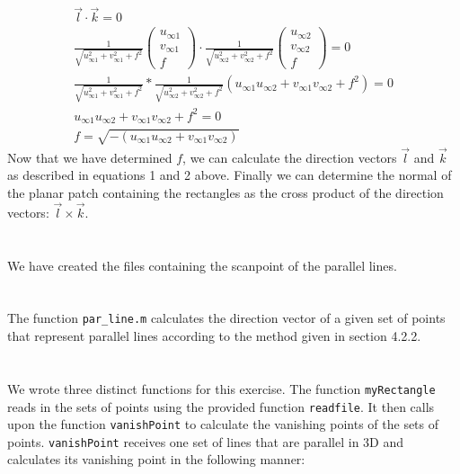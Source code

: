 \documentclass{article}
\begin{document}
\begin{align}
\vec{l} \cdot \vec{k}  = 0 \\
\frac{1}{\sqrt{u_{\infty 1}^2+v_{\infty 1}^2+f^2}}
\left(
\begin{array}{c}
u_{\infty 1} \\ v_{\infty 1} \\ f
\end{array}
\right) \cdot \frac{1}{\sqrt{u_{\infty 2}^2+v_{\infty 2}^2+f^2}}
\left(
\begin{array}{c}
u_{\infty 2} \\ v_{\infty 2} \\ f
\end{array}
\right)  = 0 \\
\frac{1}{\sqrt{u_{\infty 1}^2+v_{\infty 1}^2+f^2}} * \frac{1}{\sqrt{u_{\infty 2}^2+v_{\infty 2}^2+f^2}} (u_{\infty 1}u_{\infty 2}+v_{\infty 1}v_{\infty 2} + f^2) = 0 \\
u_{\infty 1}u_{\infty 2}+v_{\infty 1}v_{\infty 2} + f^2 = 0 \\
f = \sqrt{-(u_{\infty 1}u_{\infty 2}+v_{\infty 1}v_{\infty 2})}
\end{align}
Now that we have determined $f$, we can calculate the direction vectors $\vec{l}$ and $\vec{k}$ as described in equations 1 and 2 above. Finally we can determine the normal of the planar patch containing the rectangles as the cross product of the direction vectors: $\vec{l} \times \vec{k}$. 

\section{}
We have created the files containing the scanpoint of the parallel lines.

\section{}
The function \texttt{par\_line.m} calculates the direction vector of a given set of points that represent parallel lines according to the method given in section 4.2.2.

\section{}
We wrote three distinct functions for this exercise. The function \texttt{myRectangle} reads in the sets of points using the provided function \texttt{readfile}. It then calls upon the function \texttt{vanishPoint} to calculate the vanishing points of the sets of points. \texttt{vanishPoint} receives one set of lines that are parallel in 3D and calculates its vanishing point in the following manner:
\end{document}
